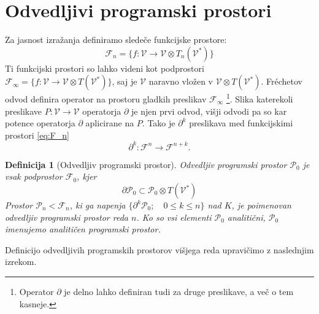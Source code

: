 \documentclass[a4paper, 12pt]{book}
\newcommand{\VV}{\mathcal{V}}
\newcommand{\F}{\mathcal{F}}
\newcommand{\dP}{\mathcal{P}}
\newcommand{\D}{\partial}
\newtheorem{definicija}{Definicija}[chapter]
\begin{document}
\section{Odvedljivi programski prostori}

Za jasnost izražanja definiramo sledeče funkcijske prostore:
 \begin{equation}\label{eq:F_n}
 	\F_n=\{f:\VV\to \VV\otimes T_n(\VV^*)\}
 \end{equation}
Ti funkcijski prostori so lahko videni kot podprostori $\F_\infty=\{f:\VV\to \VV\otimes
T(\VV^*)\}$, saj je $\VV$ naravno vložen v $\VV\otimes T(\VV^*)$. Fréchetov odvod definira operator na prostoru gladkih preslikav $\F_\infty$ \footnote{Operator $\D$ je delno lahko definiran tudi za druge preslikave, a več o tem kasneje.}. Slika katerekoli preslikave $P:\VV\to\VV$ operatorja $\D$ je njen prvi odvod, višji odvodi pa so kar potence operatorja $\D$ aplicirane na $P$. Tako je $\D^k$ preslikava med funkcijskimi prostori \eqref{eq:F_n}
\begin{equation}\label{eq:toFn+k}
 \D^k:\F^n\to\F^{n+k}.
 \end{equation}
\begin{definicija}[Odvedljiv programski prostor]
Odvedljiv programski prostor $\dP_0$ je vsak podprostor $\F_0$, kjer
\begin{equation}\label{eq:P}
 	\D\dP_0\subset\dP_0\otimes T(\VV^*)
\end{equation}
Prostor $\dP_n<\F_n$, ki ga napenja $\{\D^k\dP_0;\quad 0\le k\le n\}$ nad $K$, je poimenovan odvedljiv programski prostor reda $n$. Ko so vsi elementi $\dP_0$ analitični, $\dP_0$ imenujemo \emph{analitičen programski prostor}. 
\end{definicija}
Definicijo odvedljivih programskih prostorov višjega reda upravičimo z naslednjim izrekom.
\end{document}

